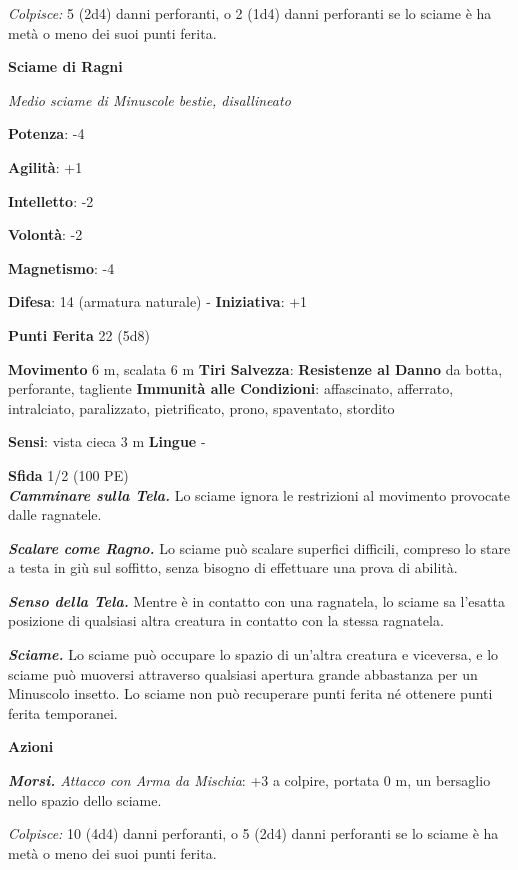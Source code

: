 \begin{multicols}{2}
\emph{Colpisce:} 5 (2d4) danni perforanti, o 2 (1d4) danni perforanti se
lo sciame è ha metà o meno dei suoi punti ferita.

\textbf{Sciame di Ragni}

\emph{Medio sciame di Minuscole bestie, disallineato}

\textbf{Potenza}: -4

\textbf{Agilità}: +1

\textbf{Intelletto}: -2

\textbf{Volontà}: -2

\textbf{Magnetismo}: -4

\textbf{Difesa}: 14 (armatura naturale) - \textbf{Iniziativa}: +1

\textbf{Punti Ferita} 22 (5d8)

\textbf{Movimento} 6 m, scalata 6 m
\textbf{Tiri Salvezza}:
\textbf{Resistenze al Danno} da botta, perforante, tagliente
\textbf{Immunità alle Condizioni}: affascinato, afferrato, intralciato,
paralizzato, pietrificato, prono, spaventato, stordito

\textbf{Sensi}: vista cieca 3 m \textbf{Lingue} -

\textbf{Sfida} 1/2 (100 PE)\smallskip\\

\emph{\textbf{Camminare sulla Tela.}} Lo sciame ignora le restrizioni al
movimento provocate dalle ragnatele.

\emph{\textbf{Scalare come Ragno.}} Lo sciame può scalare superfici
difficili, compreso lo stare a testa in giù sul soffitto, senza bisogno
di effettuare una prova di abilità.

\emph{\textbf{Senso della Tela.}} Mentre è in contatto con una
ragnatela, lo sciame sa l'esatta posizione di qualsiasi altra creatura
in contatto con la stessa ragnatela.

\emph{\textbf{Sciame.}} Lo sciame può occupare lo spazio di un'altra
creatura e viceversa, e lo sciame può muoversi attraverso qualsiasi
apertura grande abbastanza per un Minuscolo insetto. Lo sciame non può
recuperare punti ferita né ottenere punti ferita temporanei.

\smallskip\textbf{Azioni}

\emph{\textbf{Morsi.} Attacco con Arma da Mischia}: +3 a colpire,
portata 0 m, un bersaglio nello spazio dello sciame.

\emph{Colpisce:} 10 (4d4) danni perforanti, o 5 (2d4) danni perforanti
se lo sciame è ha metà o meno dei suoi punti ferita.


\end{multicols}
